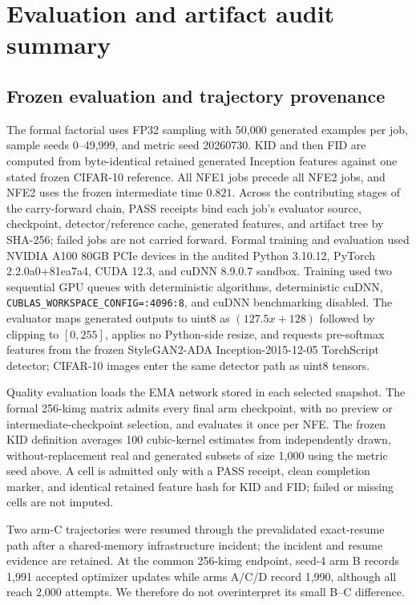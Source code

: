 \documentclass{article}
\begin{document}
\section{Evaluation and artifact audit summary}
\label{app:evaluation-audit}

\subsection{Frozen evaluation and trajectory provenance}

The formal factorial uses FP32 sampling with 50,000 generated examples per
job, sample seeds 0--49,999, and metric seed 20260730. KID and then FID are
computed from byte-identical retained generated Inception features against one
stated frozen CIFAR-10 reference. All NFE1 jobs precede all NFE2 jobs, and NFE2
uses the frozen intermediate time $0.821$. Across the contributing stages of
the carry-forward chain, PASS receipts bind each job's evaluator source,
checkpoint, detector/reference cache, generated features, and artifact tree by
SHA-256; failed jobs are not carried forward. Formal training and evaluation
used NVIDIA A100 80GB PCIe devices in the audited Python 3.10.12, PyTorch
2.2.0a0+81ea7a4, CUDA 12.3, and cuDNN 8.9.0.7 sandbox. Training used two
sequential GPU queues with deterministic algorithms, deterministic cuDNN,
\texttt{CUBLAS\_WORKSPACE\_CONFIG=:4096:8}, and cuDNN benchmarking disabled.
The evaluator maps generated outputs to uint8 as
$(127.5x+128)$ followed by clipping to $[0,255]$, applies no Python-side
resize, and requests pre-softmax features from the frozen
StyleGAN2-ADA Inception-2015-12-05 TorchScript detector; CIFAR-10 images enter
the same detector path as uint8 tensors.

Quality evaluation loads the EMA network stored in each selected snapshot.
The formal 256-kimg matrix admits every final arm checkpoint, with no preview
or intermediate-checkpoint selection, and evaluates it once per NFE. The
frozen KID definition averages 100 cubic-kernel estimates from independently
drawn, without-replacement real and generated subsets of size 1,000 using the
metric seed above. A cell is admitted only with a PASS receipt, clean
completion marker, and identical retained feature hash for KID and FID;
failed or missing cells are not imputed.

Two arm-C trajectories were resumed through the prevalidated exact-resume path
after a shared-memory infrastructure incident; the incident and resume evidence
are retained. At the common 256-kimg endpoint, seed-4 arm B records 1,991
accepted optimizer updates while arms A/C/D record 1,990, although all reach
2,000 attempts. We therefore do not overinterpret its small B--C difference.
\end{document}
